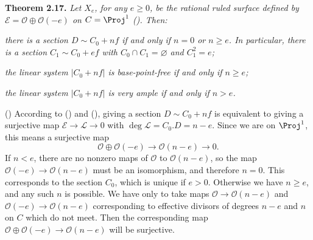 {\medskip
\noindent\hypertarget{result-V-2.17}{}\textbf{Theorem 2.17.} \emph{Let $X_e$, for any $e\ge0$, be the rational ruled surface defined by $\mathcal E=\mathcal O\oplus\mathcal O(-e)$ on $C=\Proj^1$ \textup{()}. Then:}
\begin{parts}
\item\hypertarget{result-V-2.17a}{} \emph{there is a section $D\sim C_0+nf$ if and only if $n=0$ or $n\ge e$. In particular, there is a section $C_1\sim C_0+ef$ with $C_0\cap C_1=\varnothing$ and $C_1^2=e$;}
\item\hypertarget{result-V-2.17b}{} \emph{the linear system $|C_0+nf|$ is base-point-free if and only if $n\ge e$;}
\item\hypertarget{result-V-2.17c}{} \emph{the linear system $|C_0+nf|$ is very ample if and only if $n>e$.}
\end{parts}

\Proof\par
() According to () and (), giving a section $D\sim C_0+nf$ is equivalent to giving a surjective map $\mathcal E\to\mathcal L\to0$ with $\deg\mathcal L=C_0.D=n-e$. Since we are on $\Proj^1$, this means a surjective map
\[
\mathcal O\oplus\mathcal O(-e)\longrightarrow\mathcal O(n-e)\longrightarrow0.
\]
\noindent If $n<e$, there are no nonzero maps of $\mathcal O$ to $\mathcal O(n-e)$, so the map $\mathcal O(-e)\to\mathcal O(n-e)$ must be an isomorphism, and therefore $n=0$. This corresponds to the section $C_0$, which is unique if $e>0$. Otherwise we have $n\ge e$, and any such $n$ is possible. We have only to take maps $\mathcal O\to\mathcal O(n-e)$ and $\mathcal O(-e)\to\mathcal O(n-e)$ corresponding to effective divisors of degrees $n-e$ and $n$ on $C$ which do not meet. Then the corresponding map $\mathcal O\oplus\mathcal O(-e)\to\mathcal O(n-e)$ will be surjective.
}
